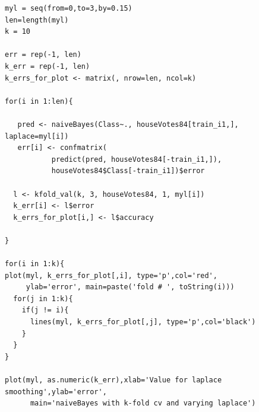 \documentclass[11pt]{article}
\begin{document}
\begin{Verbatim}
myl = seq(from=0,to=3,by=0.15)
len=length(myl)
k = 10

err = rep(-1, len)
k_err = rep(-1, len)
k_errs_for_plot <- matrix(, nrow=len, ncol=k)

for(i in 1:len){

   pred <- naiveBayes(Class~., houseVotes84[train_i1,], laplace=myl[i])
   err[i] <- confmatrix(
           predict(pred, houseVotes84[-train_i1,]), 
           houseVotes84$Class[-train_i1])$error

  l <- kfold_val(k, 3, houseVotes84, 1, myl[i])
  k_err[i] <- l$error
  k_errs_for_plot[i,] <- l$accuracy

}

for(i in 1:k){
plot(myl, k_errs_for_plot[,i], type='p',col='red', 
     ylab='error', main=paste('fold # ', toString(i)))
  for(j in 1:k){
  	if(j != i){
      lines(myl, k_errs_for_plot[,j], type='p',col='black')
    }
  }
}

plot(myl, as.numeric(k_err),xlab='Value for laplace smoothing',ylab='error',
      main='naiveBayes with k-fold cv and varying laplace')


\end{Verbatim}
\end{document}
